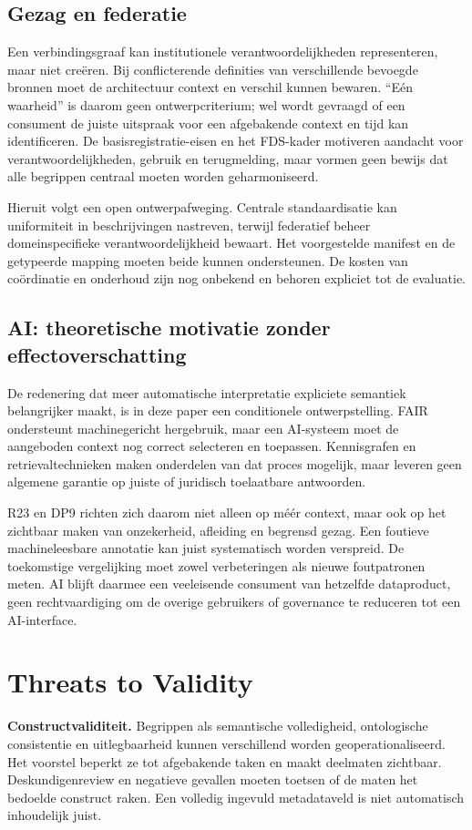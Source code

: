 \subsection{Gezag en federatie}
Een verbindingsgraaf kan institutionele verantwoordelijkheden representeren, maar niet creëren. Bij conflicterende definities van verschillende bevoegde bronnen moet de architectuur context en verschil kunnen bewaren. ``Eén waarheid'' is daarom geen ontwerpcriterium; wel wordt gevraagd of een consument de juiste uitspraak voor een afgebakende context en tijd kan identificeren. De basisregistratie-eisen en het FDS-kader motiveren aandacht voor verantwoordelijkheden, gebruik en terugmelding, maar vormen geen bewijs dat alle begrippen centraal moeten worden geharmoniseerd. \citep{S25,S27}

Hieruit volgt een open ontwerpafweging. Centrale standaardisatie kan uniformiteit in beschrijvingen nastreven, terwijl federatief beheer domeinspecifieke verantwoordelijkheid bewaart. Het voorgestelde manifest en de getypeerde mapping moeten beide kunnen ondersteunen. De kosten van coördinatie en onderhoud zijn nog onbekend en behoren expliciet tot de evaluatie.

\subsection{AI: theoretische motivatie zonder effectoverschatting}
De redenering dat meer automatische interpretatie expliciete semantiek belangrijker maakt, is in deze paper een conditionele ontwerpstelling. FAIR ondersteunt machinegericht hergebruik, maar een AI-systeem moet de aangeboden context nog correct selecteren en toepassen. \citep{L11} Kennisgrafen en retrievaltechnieken maken onderdelen van dat proces mogelijk, maar leveren geen algemene garantie op juiste of juridisch toelaatbare antwoorden. \citep{L13,L16}

R23 en DP9 richten zich daarom niet alleen op méér context, maar ook op het zichtbaar maken van onzekerheid, afleiding en begrensd gezag. Een foutieve machineleesbare annotatie kan juist systematisch worden verspreid. De toekomstige vergelijking moet zowel verbeteringen als nieuwe foutpatronen meten. AI blijft daarmee een veeleisende consument van hetzelfde dataproduct, geen rechtvaardiging om de overige gebruikers of governance te reduceren tot een AI-interface.

\section{Threats to Validity}
\textbf{Constructvaliditeit.} Begrippen als semantische volledigheid, ontologische consistentie en uitlegbaarheid kunnen verschillend worden geoperationaliseerd. Het voorstel beperkt ze tot afgebakende taken en maakt deelmaten zichtbaar. Deskundigenreview en negatieve gevallen moeten toetsen of de maten het bedoelde construct raken. Een volledig ingevuld metadataveld is niet automatisch inhoudelijk juist.

